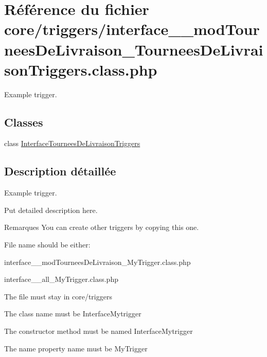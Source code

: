 \hypertarget{interface__99__modTourneesDeLivraison__TourneesDeLivraisonTriggers_8class_8php}{}\section{Référence du fichier core/triggers/interface\+\_\+\_\+mod\+Tournees\+De\+Livraison\+\_\+\+Tournees\+De\+Livraison\+Triggers.class.\+php}
\label{interface__99__modTourneesDeLivraison__TourneesDeLivraisonTriggers_8class_8php}


Example trigger.  


\subsection*{Classes}
\begin{DoxyCompactItemize}
\item 
class \hyperlink{classInterfaceTourneesDeLivraisonTriggers}{Interface\+Tournees\+De\+Livraison\+Triggers}
\end{DoxyCompactItemize}


\subsection{Description détaillée}
Example trigger. 

Put detailed description here.

\begin{DoxyRemark}{Remarques}
You can create other triggers by copying this one.
\begin{DoxyItemize}
\item File name should be either\+:
\begin{DoxyItemize}
\item interface\+\_\+\_\+mod\+Tournees\+De\+Livraison\+\_\+\+My\+Trigger.\+class.\+php
\item interface\+\_\+\_\+all\+\_\+\+My\+Trigger.\+class.\+php
\end{DoxyItemize}
\item The file must stay in core/triggers
\item The class name must be Interface\+Mytrigger
\item The constructor method must be named Interface\+Mytrigger
\item The name property name must be My\+Trigger 
\end{DoxyItemize}
\end{DoxyRemark}
